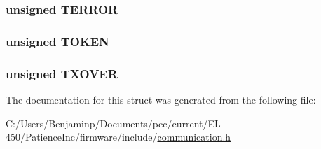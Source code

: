 \subsubsection[{T\+E\+R\+R\+O\+R}]{\setlength{\rightskip}{0pt plus 5cm}unsigned T\+E\+R\+R\+O\+R}\label{structcomstat__t_a6280d63145bb20f921aed12654cca74b}
\hypertarget{structcomstat__t_a286e5d66a5e535c50a8b89c9d4870370}{}
\subsubsection[{T\+O\+K\+E\+N}]{\setlength{\rightskip}{0pt plus 5cm}unsigned T\+O\+K\+E\+N}\label{structcomstat__t_a286e5d66a5e535c50a8b89c9d4870370}
\hypertarget{structcomstat__t_a008f2e947c6ef85c19ebd817436ae178}{}
\subsubsection[{T\+X\+O\+V\+E\+R}]{\setlength{\rightskip}{0pt plus 5cm}unsigned T\+X\+O\+V\+E\+R}\label{structcomstat__t_a008f2e947c6ef85c19ebd817436ae178}


The documentation for this struct was generated from the following file\+:\begin{DoxyCompactItemize}
\item 
C\+:/\+Users/\+Benjaminp/\+Documents/pcc/current/\+E\+L 450/\+Patience\+Inc/firmware/include/\hyperlink{communication_8h}{communication.\+h}\end{DoxyCompactItemize}
